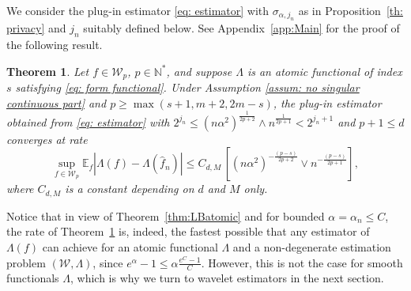 \documentclass[preprint]{imsart}
\newcommand\norm[1]{\left\lVert#1\right\rVert}
\newtheorem{theorem}{Theorem}[section]
\numberwithin{equation}{section}
\newcounter{cond}
\begin{document}
We consider the plug-in estimator \eqref{eq: estimator} with $\sigma_{\alpha,j_n}$ as in Proposition~\ref{th: privacy} and $j_n$ suitably defined below. See Appendix~\ref{app:Main} for the proof of the following result.

\begin{theorem}\label{th: rate atomic}
    Let $f\in \mathcal{W}_{p}$, $p\in\mathbb{N}^*$, and suppose $\Lambda$ is an atomic functional of index $s$ satisfying \eqref{eq: form functional}. Under Assumption \ref{assum: no singular continuous part} and $p\geq \max(s+1, m+2, 2m-s)$, the plug-in estimator obtained from 
    \eqref{eq: estimator} with $2^{j_n}\leq(n\alpha^2)^{\frac{1}{2p+2}}\wedge n^{\frac{1}{2p+1}} < 2^{j_n+1}$ and $p+1\leq d$ converges at rate 
    \[\underset{f\in\mathcal{W}_p}{\sup}\mathbb{E}_f|\Lambda(f)-\Lambda(\hat{f}_n)|\leq C_{d,M}\, \left[(n\alpha^2)^{-\frac{(p-s)}{2p+2}}\vee n^{-\frac{(p-s)}{2p+1}}\right],\]
    where $C_{d,M}$ is a constant depending on $d$ and $M$ only.
\end{theorem}

Notice that in view of Theorem~\ref{thm:LBatomic} and for bounded $\alpha=\alpha_n\le C$, the rate of Theorem~\ref{th: rate atomic} is, indeed, the fastest possible that any estimator of $\Lambda(f)$ can achieve for an atomic functional $\Lambda$ and a non-degenerate estimation problem $(\mathcal W,\Lambda)$, since $e^\alpha-1\le \alpha\frac{e^C-1}{C}$. However, this is not the case for smooth functionals $\Lambda$, which is why we turn to wavelet estimators in the next section.


\end{document}
